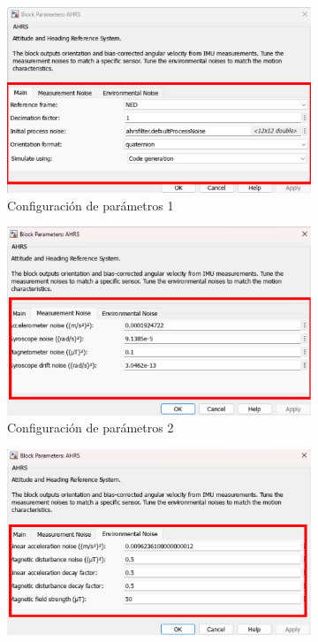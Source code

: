 \begin{figure}[htbp]
\begin{subfigure}[b]{0.45\textwidth}
        \centering
        \includegraphics[width=\textwidth]{fig/Capitulo5/Caso_de_estudio_IMU/Generador_de_salidas/configuracion_AHRS_01.pdf}
        \caption{Configuración de parámetros 1}
        \label{fig:parametros_AHRS_01}
    \end{subfigure}
    \hfill
    \begin{subfigure}[b]{0.45\textwidth}
        \centering
        \includegraphics[width=\textwidth]{fig/Capitulo5/Caso_de_estudio_IMU/Generador_de_salidas/configuracion_AHRS_02.pdf}
        \caption{Configuración de parámetros 2}
        \label{fig:parametros_AHRS_02}
    \end{subfigure}
    \hfill
    \begin{subfigure}[b]{0.45\textwidth}
        \centering
        \includegraphics[width=\textwidth]{fig/Capitulo5/Caso_de_estudio_IMU/Generador_de_salidas/configuracion_AHRS_03.pdf}

\end{subfigure}
\end{figure}
